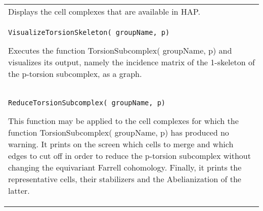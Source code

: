 \documentclass[a4paper,11pt]{report}
\begin{document}
{\begin{center}
\begin{tabular}{|l|}
 Displays the cell complexes that are available in HAP. \\
 \index{VisualizeTorsionSkeleton} \texttt{VisualizeTorsionSkeleton( groupName, p)} 

 Executes the function TorsionSubcomplex( groupName, p) and visualizes its
output, namely the incidence matrix of the 1-skeleton of the p-torsion
subcomplex, as a graph. \\
 \index{ReduceTorsionSubcomplex} \texttt{ReduceTorsionSubcomplex( groupName, p)} 

 This function may be applied to the cell complexes for which the function
TorsionSubcomplex( groupName, p) has produced no warning. It prints on the
screen which cells to merge and which edges to cut off in order to reduce the
p-torsion subcomplex without changing the equivariant Farrell cohomology.
Finally, it prints the representative cells, their stabilizers and the
Abelianization of the latter. \\
\end{tabular}\\[2mm]
\end{center}

 }

 
\end{document}
